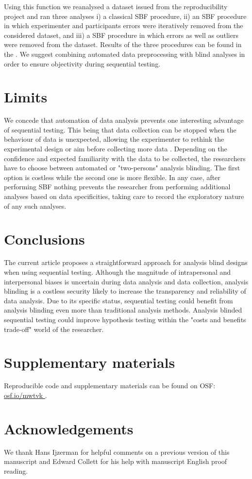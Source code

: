 \documentclass[a4paper,man,natbib,floatsintext,donotrepeattitle]{apa6}
\begin{document}
Using this function we reanalysed a dataset issued from the reproducibility project \citep{open_science_collaboration_estimating_2015} and ran three analyses i) a classical SBF procedure, ii) an SBF procedure in which experimenter and participants errors were iteratively removed from the considered dataset, and iii) a SBF procedure in which errors as well as outliers were removed from the dataset. Results of the three procedures can be found in the . We suggest combining automated data preprocessing with blind analyses in order to ensure objectivity during sequential testing.

\section{Limits}

We concede that automation of data analysis prevents one interesting advantage of sequential testing. This being that data collection can be stopped when the behaviour of data is unexpected, allowing the experimenter to rethink the experimental design or aim  before collecting more data \citep{lakens_performing_2014}. Depending on the confidence and expected familiarity with the data to be collected, the researchers have to choose between automated or "two-persons" analysis blinding. The first option is costless while the second one is more flexible. In any case, after performing SBF nothing prevents the researcher from performing additional analyses based on data specificities, taking care to record the exploratory nature of any such analyses. 

\section{Conclusions}

The current article proposes a straightforward approach for analysis blind designs when using sequential testing. Although the magnitude of intrapersonal and interpersonal biases is uncertain during data analysis and data collection, analysis blinding is a costless security likely to increase the transparency and reliability of data analysis. Due to its specific status, sequential testing could benefit from analysis blinding even more than traditional analysis methods. Analysis blinded sequential testing could improve hypothesis testing within the "costs and benefits trade-off" world of the researcher.

\section{Supplementary materials}\label{sec:supp}

Reproducible code and supplementary materials can be found on OSF: \url{osf.io/mwtvk
}.

\section{Acknowledgements}

We thank Hans Ijzerman for helpful comments on a previous version of this manuscript and Edward Collett for his help with manuscript English proof reading.


\end{document}
